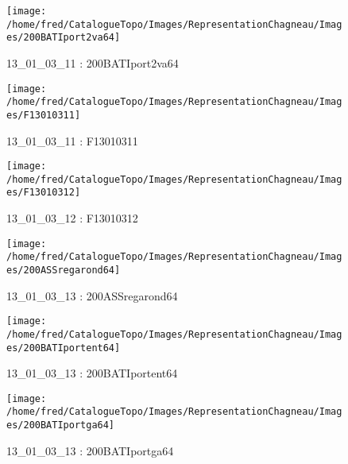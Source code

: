 \documentclass[12pt,titlepage,oneside]{book}
\begin{document}
\begin{figure}[h!]
\begin{minipage}[t]{3cm}
\begin{center}
      \texttt{[image: /home/fred/CatalogueTopo/Images/RepresentationChagneau/Images/200BATIport2va64]}
      \caption[200BATIport2va64]{\label{} 13\_01\_03\_11 : 200BATIport2va64}
    \end{center}
  \end{minipage}
  \begin{minipage}[t]{3cm}
    \begin{center}
      \texttt{[image: /home/fred/CatalogueTopo/Images/RepresentationChagneau/Images/F13010311]}
      \caption[F13010311]{\label{} 13\_01\_03\_11 : F13010311}
    \end{center}
  \end{minipage}
  \begin{minipage}[t]{3cm}
    \begin{center}
      \texttt{[image: /home/fred/CatalogueTopo/Images/RepresentationChagneau/Images/F13010312]}
      \caption[F13010312]{\label{} 13\_01\_03\_12 : F13010312}
    \end{center}
  \end{minipage}
  \begin{minipage}[t]{3cm}
    \begin{center}
      \texttt{[image: /home/fred/CatalogueTopo/Images/RepresentationChagneau/Images/200ASSregarond64]}
      \caption[200ASSregarond64]{\label{} 13\_01\_03\_13 : 200ASSregarond64}
    \end{center}
  \end{minipage}
  \begin{minipage}[t]{3cm}
    \begin{center}
      \texttt{[image: /home/fred/CatalogueTopo/Images/RepresentationChagneau/Images/200BATIportent64]}
      \caption[200BATIportent64]{\label{} 13\_01\_03\_13 : 200BATIportent64}
    \end{center}
  \end{minipage}
  \begin{minipage}[t]{3cm}
    \begin{center}
      \texttt{[image: /home/fred/CatalogueTopo/Images/RepresentationChagneau/Images/200BATIportga64]}
      \caption[200BATIportga64]{\label{} 13\_01\_03\_13 : 200BATIportga64}
    \end{center}

\end{minipage}
\end{figure}
\end{document}
